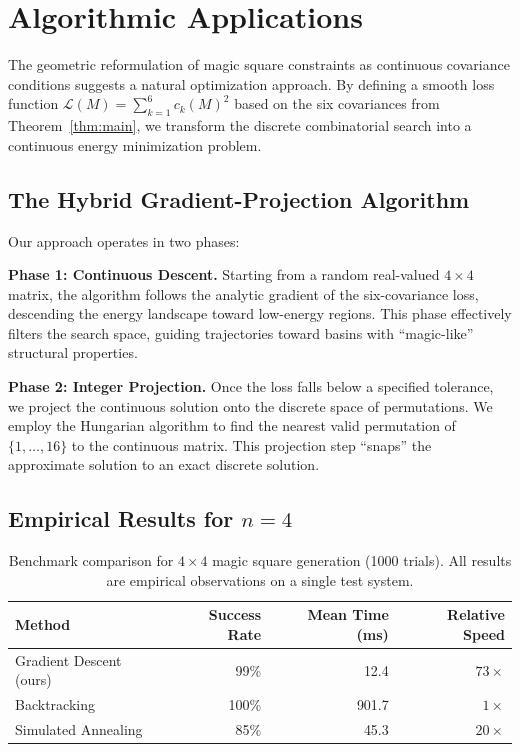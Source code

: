 \section{Algorithmic Applications}\label{sec:optimization}

The geometric reformulation of magic square constraints as continuous covariance conditions suggests a natural optimization approach. By defining a smooth loss function $\mathcal{L}(M) = \sum_{k=1}^{6} c_k(M)^2$ based on the six covariances from Theorem~\ref{thm:main}, we transform the discrete combinatorial search into a continuous energy minimization problem.

\subsection{The Hybrid Gradient-Projection Algorithm}

Our approach operates in two phases:

\textbf{Phase 1: Continuous Descent.} Starting from a random real-valued $4 \times 4$ matrix, the algorithm follows the analytic gradient of the six-covariance loss, descending the energy landscape toward low-energy regions. This phase effectively filters the search space, guiding trajectories toward basins with ``magic-like'' structural properties.

\textbf{Phase 2: Integer Projection.} Once the loss falls below a specified tolerance, we project the continuous solution onto the discrete space of permutations. We employ the Hungarian algorithm to find the nearest valid permutation of $\{1, \ldots, 16\}$ to the continuous matrix. This projection step ``snaps'' the approximate solution to an exact discrete solution.

\subsection{Empirical Results for $n=4$}

\begin{table}[H]
\centering
\caption{Benchmark comparison for $4 \times 4$ magic square generation (1000 trials). All results are empirical observations on a single test system.}
\label{tab:benchmark}
\begin{tabular}{lrrr}
\toprule
\textbf{Method} & \textbf{Success Rate} & \textbf{Mean Time (ms)} & \textbf{Relative Speed} \\
\midrule
Gradient Descent (ours) & 99\% & 12.4 & $73\times$ \\
Backtracking & 100\% & 901.7 & $1\times$ \\
Simulated Annealing & 85\% & 45.3 & $20\times$ \\
\bottomrule
\end{tabular}
\end{table}

